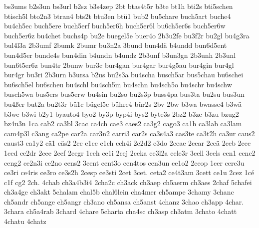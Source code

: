 {    bs3ums
    b2s3un
    bs3url
    b2sz
    b3s4zep
    2bt
    btas4t5r
    b3te
    bt1h
    bti2s
    bti5schen
    btisch5l
    bto2n3
    btran4
    bts2t
    btu3en
    btü1
    bub2
    bu5chare
    buch5art
    buche4
    bu4ch5ec
    buch5ere
    buch5erf
    buch5er6h
    buch5er6l
    bu6ch5er6s
    buch5er6w
    buch5er6z
    bu4chet
    buchs4p
    bu2e
    buegel5e
    buer4o
    2b3u2fe
    bu3f2r
    bu2gl
    bu4g3ra
    bul4l3a
    2b3umf
    2bumk
    2bumr
    bu3n2a
    3bund
    bun4dä
    b4undd
    bun6d5ent
    bun4d5er
    bunde4s
    bun4din
    b4undn
    b4undz
    2b3unf
    b3un3gn
    2b3unh
    2b3unl
    bun6t5er6z
    bun4tr
    2bunw
    bur3c
    bur4gan
    bur4gar
    bur4g5au
    bur4gin
    bur4gl
    bur4gr
    bu3ri
    2b3urn
    b3ursa
    b2us
    bu2s3a
    bu4scha
    busch5ar
    bus5chau
    bu6schei
    bu6sch5el
    bu6scheu
    bu4schl
    bu4sch5m
    bu4schn
    bu4sch5o
    bu4schr
    bu4schw
    busch5wa
    bus5ers
    bus5erw
    bu4sin
    bu2so
    bu2s3p
    buss4pa
    bus3ta
    bu2su
    bus3un
    bu4ßer
    but2a
    bu2t3r
    bü1c
    bügel5e
    bühre4
    bür2s
    2bv
    2bw
    b3wa
    bwasse4
    b3wä
    b3we
    b3wi
    b2y1
    byauto4
    byo2
    by3p
    byp4i
    bys2
    byte3s
    2bz2
    b3ze
    b3zu
    bzug2
    bz4u3n
    1ca
    cab2
    ca3bl
    3cac
    ca4ch
    cae3
    caes2
    ca3g2
    cago3
    ca1h
    ca3lab
    ca3lam
    cam4p3l
    c3ang
    ca2pe
    car2a
    car3n2
    carri3
    car2s
    ca3s4a3
    cas3te
    ca3t2h
    ca3ur
    caus2
    caust3
    ca1y2
    cä1
    cäs2
    2cc
    c1ce
    c1ch
    cch4i
    2c2d2
    c3do
    2ceae
    2cear
    2ceä
    2ceb
    2cec
    1ced
    ce2dr
    2cee
    2cef
    2cegr
    1ceh
    ce1i
    2cej
    2ceka
    ce3l2a
    cele3r
    3cell
    3cels
    cen1
    cene2
    ceng2
    ce2n3i
    ce2no
    cens2
    3cent
    cent3o
    cen4tos
    cen3un
    ce1o2
    2ceop
    1cer
    cere3u
    ce3ri
    ce4ris
    ce3ro
    ce3s2h
    2cesp
    ce3sti
    2cet
    3cet.
    ceta2
    ce4t3am
    3cett
    ce1u
    2cez
    1cé
    c1f
    cg2
    2ch.
    4chab
    ch3a4b3i4
    2cha2c
    ch3ack
    ch3aep
    ch5aerm
    ch3aes
    2chaf
    5chafei
    ch3a4ge
    ch3akt
    5chalam
    chal5b
    chal6lein
    cha4mer
    ch5ampe
    3chamy
    3chanc
    ch5andr
    ch5ange
    ch5angr
    ch3ano
    ch5ansa
    ch5anst
    4chanz
    3chao
    ch3app
    4char.
    3chara
    ch5a4rab
    3chard
    4chare
    5charta
    cha4sc
    ch3asp
    ch3atm
    3chato
    4chatt
    4chatu
    4chatz
}
